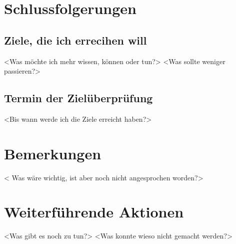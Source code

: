 \section{Schlussfolgerungen}
\subsection{Ziele, die ich errecihen will}
<Was möchte ich mehr wissen, können oder tun?>
<Was sollte weniger passieren?>
\subsection{Termin der Zielüberprüfung}
<Bis wann werde ich die Ziele erreicht haben?>

\section{Bemerkungen}
< Was wäre wichtig, ist aber noch nicht angesprochen worden?>

\section{Weiterführende Aktionen}
<Was gibt es noch zu tun?>
<Was konnte wieso nicht gemacht werden?>
